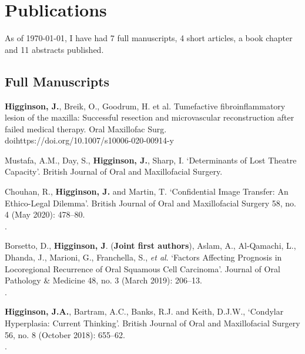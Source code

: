 \section*{Publications}
\label{publications}


As of \today, I have had 7 full manuscripts, 4 short articles, a book chapter and 11 abstracts published.

\subsection*{Full Manuscripts}

\textbf{ Higginson, J.}, Breik, O., Goodrum, H. et al. Tumefactive fibroinflammatory lesion of the maxilla: Successful resection and microvascular reconstruction after failed medical therapy. Oral Maxillofac Surg. 
\\doi{https://doi.org/10.1007/s10006-020-00914-y}

\vspace{0.1cm}

 Mustafa, A.M., Day, S., \textbf{Higginson, J.}, Sharp, I. `Determinants of Lost Theatre Capacity'. British Journal of Oral and Maxillofacial Surgery.
\\

\vspace{0.1cm}

 Chouhan, R., \textbf{Higginson, J.} and Martin, T. `Confidential Image Transfer: An Ethico-Legal Dilemma’. British Journal of Oral and Maxillofacial Surgery 58, no. 4 (May 2020): 478–80. 
\\.

\vspace{0.1cm}

 Borsetto, D., \textbf{Higginson, J}. (\textbf{Joint first authors}), Aslam, A., Al‐Qamachi, L., Dhanda, J., Marioni, G., Franchella, S., \textit{et al}. `Factors Affecting Prognosis in Locoregional Recurrence of Oral Squamous Cell Carcinoma’. Journal of Oral Pathology \& Medicine 48, no. 3 (March 2019): 206–13.
\\.

\vspace{0.1cm}

 \textbf{Higginson, J.A.}, Bartram, A.C., Banks, R.J. and Keith, D.J.W., `Condylar Hyperplasia: Current Thinking’. British Journal of Oral and Maxillofacial Surgery 56, no. 8 (October 2018): 655–62. 
\\.


